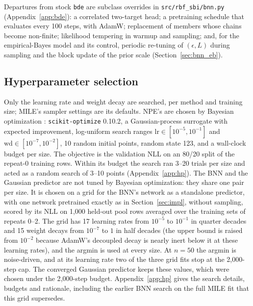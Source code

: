 \documentclass[11pt]{article}
\newcommand{\code}[1]{\texttt{#1}}
\begin{document}
Departures from stock \code{bde} are subclass overrides in \code{src/rbf\_sbi/bnn.py} (Appendix~\ref{app:bde}): a correlated
two-target head; a pretraining schedule that evaluates every 100 steps, with AdamW; replacement of members whose chains
become non-finite; likelihood tempering in warmup and sampling; and, for the empirical-Bayes model and its control,
periodic re-tuning of $(\epsilon,L)$ during sampling and the block update of the prior scale
(Section~\ref{sec:bnn_eb}).

\subsection{Hyperparameter selection}
\label{sec:hp}
Only the learning rate and weight decay are searched, per method and training size; MILE's sampler settings are its
defaults. NPE's are chosen by Bayesian optimization \citep{snoek2012practical}: \code{scikit-optimize} 0.10.2, a Gaussian-process surrogate with expected
improvement, log-uniform search ranges $\mathrm{lr}\in[10^{-5},10^{-1}]$ and $\mathrm{wd}\in[10^{-7},10^{-2}]$,
10 random initial points, random state 123, and a wall-clock budget per size. The objective is the validation NLL on an 80/20
split of the repeat-0 training rows. Within its budget the search ran 3--20 trials per size and acted as a random search
of 3--10 points (Appendix~\ref{app:hp}). The BNN and the Gaussian predictor are not tuned by Bayesian optimization: they
share one pair per size. It is chosen on a grid for the BNN's network as a standalone predictor, with one network
pretrained exactly as in Section~\ref{sec:impl}, without sampling, scored by its NLL on 1{,}000 held-out pool rows averaged over the training
sets of repeats 0--2. The grid has 17 learning rates from $10^{-5}$ to $10^{-1}$ in quarter decades and 15 weight decays
from $10^{-7}$ to $1$ in half decades (the upper bound is raised from $10^{-2}$ because AdamW's decoupled decay is
nearly inert below it at these learning rates), and the argmin is used at every size. At $n=50$ the argmin is
noise-driven, and at its learning rate two of the three grid fits stop at the 2{,}000-step cap. The converged Gaussian
predictor keeps these values, which were chosen under the 2{,}000-step budget. Appendix~\ref{app:hp} gives the search details, budgets and rationale, including
the earlier BNN search on the full MILE fit that this grid supersedes.
\end{document}
